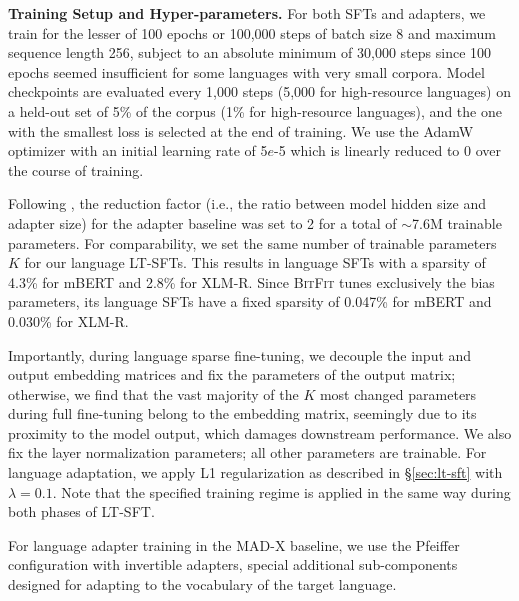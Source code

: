  \textbf{Training Setup and Hyper-parameters.} For both SFTs and adapters, we train for the lesser of 100 epochs or 100,000 steps of batch size 8 and maximum sequence length 256, subject to an absolute minimum of 30,000 steps since 100 epochs seemed insufficient for some languages with very small corpora. Model checkpoints are evaluated every 1,000 steps (5,000 for high-resource languages) on a held-out set of 5\% of the corpus (1\% for high-resource languages), and the one with the smallest loss is selected at the end of training. We use the AdamW optimizer \citep{loshchilov-hutter-2019-decoupled} with an initial learning rate of 5$e$-5 which is linearly reduced to 0 over the course of training.

Following \citet{pfeiffer-etal-2020-mad}, the reduction factor (i.e., the ratio between model hidden size and adapter size) for the adapter baseline was set to 2 for a total of $\sim$7.6M trainable parameters. For comparability, we set the same number of trainable parameters $K$ for our language LT-SFTs. This results in language SFTs with a sparsity of 4.3\% for mBERT and 2.8\% for XLM-R. Since {\textsc{BitFit}} tunes exclusively the bias parameters, its language SFTs have a fixed sparsity of 0.047\% for mBERT and 0.030\% for XLM-R.

Importantly, during language sparse fine-tuning, we decouple the input and output embedding matrices and fix the parameters of the output matrix; otherwise, we find that the vast majority of the $K$ most changed parameters during full fine-tuning belong to the embedding matrix, seemingly due to its proximity to the model output, which damages downstream performance. We also fix the layer normalization parameters; all other parameters are trainable. For language adaptation, we apply L1 regularization as described in \S\ref{sec:lt-sft} with $\lambda = 0.1$. Note that the specified training regime is applied in the same way during both phases of LT-SFT.

For language adapter training in the MAD-X baseline, we use the Pfeiffer configuration \citep{pfeiffer-etal-2021-adapterfusion} with invertible adapters, special additional sub-components designed for adapting to the vocabulary of the target language.

